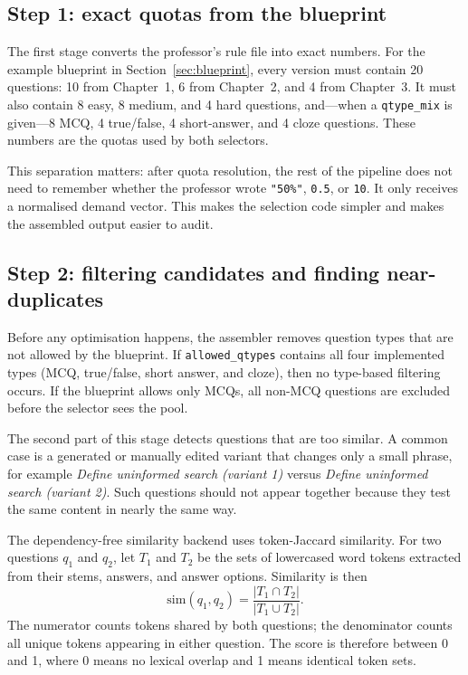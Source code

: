 \documentclass[11pt,a4paper]{article}
\newcommand{\code}[1]{\texttt{\small #1}}
\begin{document}
\subsection{Step 1: exact quotas from the blueprint}

The first stage converts the professor's rule file into exact numbers. For the
example blueprint in Section~\ref{sec:blueprint}, every version must contain
20 questions: 10 from Chapter~1, 6 from Chapter~2, and 4 from Chapter~3. It
must also contain 8 easy, 8 medium, and 4 hard questions, and---when a
\code{qtype\_mix} is given---8 MCQ, 4 true/false, 4 short-answer, and 4 cloze
questions. These numbers are the quotas used by both selectors.

This separation matters: after quota resolution, the rest of the pipeline does
not need to remember whether the professor wrote \code{"50\%"}, \code{0.5}, or
\code{10}. It only receives a normalised demand vector. This makes the
selection code simpler and makes the assembled output easier to audit.

\subsection{Step 2: filtering candidates and finding near-duplicates}

Before any optimisation happens, the assembler removes question types that are
not allowed by the blueprint. If \code{allowed\_qtypes} contains all four
implemented types (MCQ, true/false, short answer, and cloze), then no type-based
filtering occurs. If the blueprint allows only MCQs, all non-MCQ questions are
excluded before the selector sees the pool.

The second part of this stage detects questions that are too similar. A common
case is a generated or manually edited variant that changes only a small phrase,
for example \emph{Define uninformed search (variant 1)} versus \emph{Define
uninformed search (variant 2)}. Such questions should not appear together
because they test the same content in nearly the same way.

The dependency-free similarity backend uses token-Jaccard similarity. For two
questions $q_1$ and $q_2$, let $T_1$ and $T_2$ be the sets of lowercased word
tokens extracted from their stems, answers, and answer options. Similarity is
then
\begin{equation}
  \mathrm{sim}(q_1,q_2)=\frac{|T_1 \cap T_2|}{|T_1 \cup T_2|}.
\end{equation}
The numerator counts tokens shared by both questions; the denominator counts
all unique tokens appearing in either question. The score is therefore between
0 and 1, where 0 means no lexical overlap and 1 means identical token sets.
\end{document}
